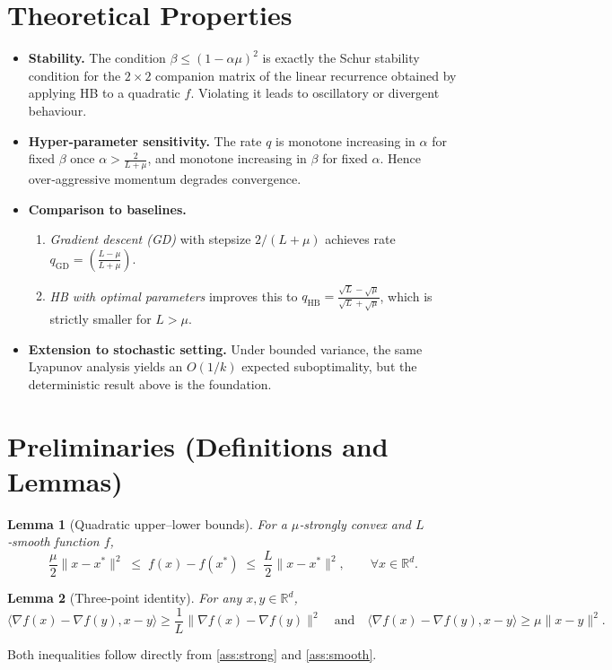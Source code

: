 \documentclass[11pt]{article}
\newtheorem{lemma}{Lemma}
\newcommand{\R}{\mathbb{R}}
\begin{document}
\section*{Theoretical Properties}
\begin{itemize}[leftmargin=*]
\item \textbf{Stability.}  The condition $\beta\le(1-\alpha\mu)^{2}$ is exactly the Schur stability condition for the $2\times2$ companion matrix of the linear recurrence obtained by applying HB to a quadratic $f$.  Violating it leads to oscillatory or divergent behaviour.
\item \textbf{Hyper‑parameter sensitivity.}  The rate $q$ is monotone increasing in $\alpha$ for fixed $\beta$ once $\alpha>\frac{2}{L+\mu}$, and monotone increasing in $\beta$ for fixed $\alpha$.  Hence over‑aggressive momentum degrades convergence.
\item \textbf{Comparison to baselines.}
    \begin{enumerate}
        \item \emph{Gradient descent (GD)} with stepsize $2/(L+\mu)$ achieves rate $q_{\text{GD}}=(\frac{L-\mu}{L+\mu})$.
        \item \emph{HB with optimal parameters} improves this to $q_{\text{HB}}=\frac{\sqrt{L}-\sqrt{\mu}}{\sqrt{L}+\sqrt{\mu}}$, which is strictly smaller for $L>\mu$.
    \end{enumerate}
\item \textbf{Extension to stochastic setting.}  Under bounded variance, the same Lyapunov analysis yields an $O(1/k)$ expected suboptimality, but the deterministic result above is the foundation.
\end{itemize}

\section*{Preliminaries (Definitions and Lemmas)}
\begin{lemma}[Quadratic upper–lower bounds]\label{lem:quad}
For a $\mu$‑strongly convex and $L$‑smooth function $f$,
\[
\frac{\mu}{2}\|x-x^{*}\|^{2}\;\le\; f(x)-f(x^{*})\;\le\;\frac{L}{2}\|x-x^{*}\|^{2},
\qquad\forall x\in\R^{d}.
\]
\end{lemma}
\begin{lemma}[Three‑point identity]\label{lem:three}
For any $x,y\in\R^{d}$,
\[
\langle \nabla f(x)-\nabla f(y),x-y\rangle \ge \frac{1}{L}\|\nabla f(x)-\nabla f(y)\|^{2}
\quad\text{and}\quad
\langle \nabla f(x)-\nabla f(y),x-y\rangle \ge \mu\|x-y\|^{2}.
\]
\end{lemma}
Both inequalities follow directly from \ref{ass:strong} and \ref{ass:smooth}.
\end{document}

